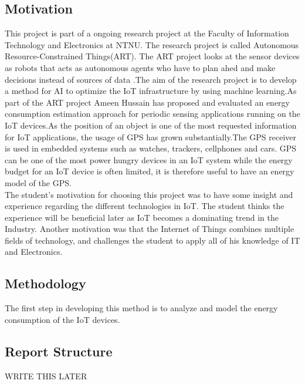\subsection{Motivation}

This project is part of a ongoing research project at the Faculty of Information Technology and Electronics at NTNU. The research project is called Autonomous Resource-Constrained Things(ART).  The ART project looks at the sensor devices as robots that acts as autonomous agents who have to plan ahed and make decisions instead of sources of data \cite{kraemer}.The aim of the research project is to develop a method for AI to optimize the IoT infrastructure by using machine learning.As part of the ART project Ameen Hussain has proposed and evaluated an energy consumption estimation approach for periodic sensing applications running on the IoT devices\cite{Amen}.As the position of an object is one of the most requested information for IoT applications, the usage of GPS has grown substantially.The GPS receiver is used in embedded systems such as watches, trackers, cellphones and cars. GPS can be one of the most power hungry devices in an IoT system while the energy budget for an IoT device is often limited, it is therefore useful to have an energy model of the GPS.\\

The student's motivation for choosing this project was to have some insight and experience regarding the different technologies in IoT. The student thinks the experience will be beneficial later as IoT becomes a dominating trend in the Industry. Another motivation was that the Internet of Things combines multiple fields of technology, and challenges the student to apply all of his knowledge of IT and Electronics.


\subsection{Methodology}



The first step in developing this method is to analyze and model the energy consumption of the IoT devices.

\subsection{Report Structure}

WRITE THIS LATER 


\newpage